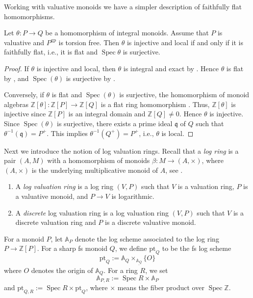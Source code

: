 \documentclass[10pt]{amsart}
\newcommand{\A}{\mathbb{A}}
\newcommand{\Z}{\mathbb{Z}}
\newcommand{\gp}{\mathrm{gp}}
\DeclareMathOperator{\Spec}{Spec}
\newcommand{\ul}{\underline}
\newcommand{\pt}{\mathrm{pt}}
\begin{document}
Working with valuative monoids we have a simpler description of faithfully flat homomorphisms. 

\begin{proposition} \label{prop:Faithfullyflatcharacterization}
Let $\theta\colon P\to Q$ be a homomorphism of integral monoids.
Assume that $P$ is valuative and $P^\gp$ is torsion free.
Then $\theta$ is
injective and local if and only if it is faithfully flat, i.e., it is flat and $\Spec{\theta}$ is surjective.
\end{proposition}
\begin{proof}
If $\theta$ is injective and local,
then $\theta$ is integral and exact by \cite[Proposition I.4.6.3 (4),(5)]{Ogu}.
Hence $\theta$ is flat by \cite[Proposition I.4.6.8]{Ogu},
and $\Spec(\theta)$ is surjective by \cite[Proposition I.4.2.2]{Ogu}.

Conversely, if $\theta$ is flat and $\Spec(\theta)$ is surjective, 
the homomorphism of monoid algebras $\Z[\theta] \colon \Z[P] \to \Z[Q]$ 
is a flat ring homomorphism \cite[Proposition I.4.5.12]{Ogu}. 
Thus, 
$\Z[\theta]$ is injective since $\Z[P]$ is an integral domain and $\Z[Q]\neq 0$.
Hence $\theta$ is injective.
Since $\Spec(\theta)$ is surjective,
there exists a prime ideal $\mathfrak{q}$ of $Q$ such that $\theta^{-1}(\mathfrak{q})=P^+$.
This implies $\theta^{-1}(Q^+)=P^+$,
i.e., $\theta$ is local.
\end{proof}

Next we introduce the notion of log valuation rings. 
Recall that a \emph{log ring} is a pair $(A, M)$ 
with a homomorphism of monoids $\beta \colon M \to (A,\times)$, 
where $(A,\times)$ is the underlying multiplicative monoid of $A$, 
see \cite[Definition III.1.2.3]{Ogu}.


\begin{definition}
\label{df:lvr}
\begin{enumerate}
\item A \emph{log valuation ring} is a log ring $(V,P)$ such that $V$ is a valuation ring, 
$P$ is a valuative monoid, and $P\to V$ is logarithmic.
\item A \textit{discrete} log valuation ring is a log valuation ring $(V,P)$ such that $V$ 
is a discrete valuation ring and $P$ is a discrete valuative monoid.
\end{enumerate}
\end{definition}

\begin{definition}
For a monoid $P$,
let $\A_{P}$ denote the log scheme associated to the log ring $P \to \Z[P].$ 
For a sharp fs monoid $Q$, 
we define $\pt_{Q}$ to be the fs log scheme $$\pt_{Q}:=\A_Q\times_{\ul{\A_Q}}\{O\}$$ 
where $O$ denotes the origin of $\A_Q$.
For a ring $R$, 
we set $$\A_{P,R}:=\Spec{R}\times \A_P$$ and $\pt_{Q,R}:=\Spec{R}\times \pt_Q$,
where $\times$ means the fiber product over $\Spec{\Z}$.
\end{definition}
\end{document}
